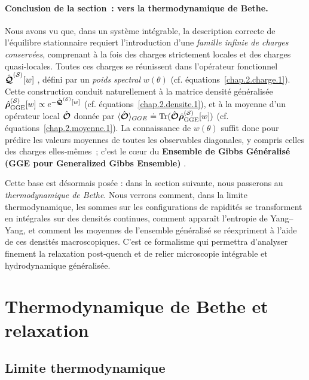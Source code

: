 \paragraph{Conclusion de la section : vers la thermodynamique de Bethe.}

Nous avons vu que, dans un système intégrable, la description correcte de l’équilibre stationnaire requiert l’introduction d’une \emph{famille infinie de charges conservées}, comprenant à la fois des charges strictement locales et des charges quasi‑locales.
Toutes ces charges se réunissent dans l’opérateur fonctionnel
\(
\hat{\bm{\mathcal{Q}}}^{(\mathcal{S})}[w]
\)
, défini par un \emph{poids spectral}  $w(\theta)$ (cf. équations~\eqref{chap.2.charge.1}).
Cette construction conduit naturellement à la matrice densité généralisée
\(
\hat{\bm{\rho}}^{(\mathcal{S})}_{\mathrm{GGE}}[w]  \propto  e^{-\hat{\bm{\mathcal{Q}}}^{(\mathcal{S})}[w]}
\) 
(cf. équations~\eqref{chap.2.densite.1}), et à la moyenne d’un opérateur local $\hat{\bm{\mathcal{O}}}$ donnée par
\(
\langle \hat{\bm{\mathcal{O}}}\rangle_{GGE}  \doteq  \displaystyle  \text{Tr} (\hat{\bm{\mathcal{O}}}\hat{\bm{\rho}}^{(\mathcal{S})}_{\mathrm{GGE}}[w])
\)
(cf. équations~\eqref{chap.2.moyenne.1}).
La connaissance de $w(\theta)$ suffit donc pour prédire les valeurs moyennes de toutes les observables diagonales, y compris celles des charges elles‑mêmes ; c’est le cœur du {\bf Ensemble de Gibbs Généralisé (GGE pour Generalized Gibbs Ensemble)} .

\medskip
Cette base est désormais posée : dans la section suivante, nous passerons au \emph{thermodynamique de Bethe}.
Nous verrons comment, dans la limite thermodynamique, les sommes sur les configurations de rapidités se transforment en intégrales sur des densités continues, comment apparaît l’entropie de Yang–Yang, et comment les moyennes de l’ensemble généralisé se réexpriment à l’aide de ces densités macroscopiques.
C’est ce formalisme qui permettra d’analyser finement la relaxation post‑quench et de relier microscopie intégrable et hydrodynamique généralisée.



%

\section{Thermodynamique de Bethe et relaxation}

\subsection{Limite thermodynamique}

